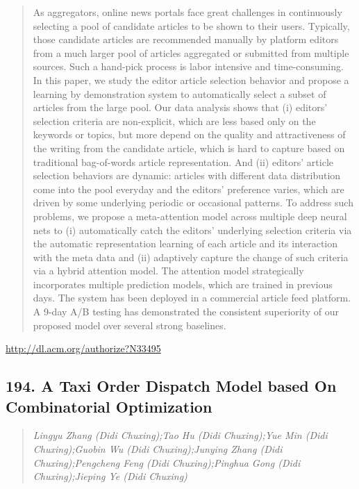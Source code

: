 \documentclass{article}
\begin{document}
\begin{quote}
As aggregators, online news portals face great challenges in continuously selecting a pool of candidate articles to be shown to their users. Typically, those candidate articles are recommended manually by platform editors from a much larger pool of articles aggregated or submitted from multiple sources. Such a hand-pick process is labor intensive and time-consuming. In this paper, we study the editor article selection behavior and propose a learning by demonstration system to automatically select a subset of articles from the large pool. Our data analysis shows that (i) editors’ selection criteria are non-explicit, which are less based only on the keywords or topics, but more depend on the quality and attractiveness of the writing from the candidate article, which is hard to capture based on traditional bag-of-words article representation. And (ii) editors’ article selection behaviors are dynamic: articles with different data distribution come into the pool everyday and the editors’ preference varies, which are driven by some underlying periodic or occasional patterns. To address such problems, we propose a meta-attention model across multiple deep neural nets to (i) automatically catch the editors’ underlying selection criteria via the automatic representation learning of each article and its interaction with the meta data and (ii) adaptively capture the change of such criteria via a hybrid attention model. The attention model strategically incorporates multiple prediction models, which are trained in previous days. The system has been deployed in a commercial article feed platform. A 9-day A/B testing has demonstrated the consistent superiority of our proposed model over several strong baselines.
\end{quote}

\href{http://dl.acm.org/authorize?N33495}{http://dl.acm.org/authorize?N33495}

\subsection{194. A Taxi Order Dispatch Model based On Combinatorial Optimization}

\begin{quote}
\footnotesize{\textit{Lingyu Zhang (Didi Chuxing);Tao Hu (Didi Chuxing);Yue Min (Didi Chuxing);Guobin Wu (Didi Chuxing);Junying Zhang (Didi Chuxing);Pengcheng Feng (Didi Chuxing);Pinghua Gong (Didi Chuxing);Jieping Ye (Didi Chuxing)}}

\end{quote}
\end{document}
